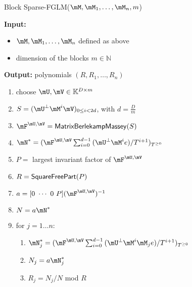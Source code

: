\documentclass[12pt]{article}
\begin{document}
\begin{algorithm}[H]
	\caption{Block Sparse-FGLM($\mM,\mM_1,\dots,\mM_n,m$)}
	{\bf Input:} \vspace{-0.5em}
	\begin{itemize}
		\item $\mM,\mM_1,\dots,\mM_n$ defined as above
		\item dimension of the blocks $m \in \mathbb{N}$
	\end{itemize}
	{\bf Output:} polynomials $(R,R_1,\dots,R_n)$
  \begin{enumerate}[{\bf 1.}]
		\item {\sf choose $\mU,\mV \in \mathbb{K}^{D \times m}$}
		\item {\sf $S= (\mU^{\perp}\mM^i\mV)_{0 \le i < 2d}$, with $d = \frac{D}{m}$}
		\item {\sf $\mF^{\mU,\mV} = {\sf MatrixBerlekampMassey}(S)$}
		\item {\sf $\mN^* = (\mF^{\mU,\mV}\sum_{i=0}^{d-1} {(\mU^{\perp}\mM^ie)}/{T^{i+1}})_{T^{\ge 0}}$} 
		\item {\sf $P=$ largest invariant factor of $\mF^{\mU,\mV}$}
		\item {\sf $R={\sf SquareFreePart}(P)$} 
		\item {\sf $a = [0 ~\cdots~ 0 ~ P] (\mF^{\mU,\mV})^{-1}$}
		\item {\sf $N=a\mN^*$}
		\item {\sf for $j = 1 \dots n$:}
    \begin{enumerate}[{\bf 9.1.}]
			\item {\sf	$\mN_j^* = (\mF^{\mU,\mV}
				\sum_{i= 0}^{d-1} {(\mU^{\perp}\mM^i \mM_j e)}/{T^{i+1}})_{T^{\ge0}}$}
			\item {\sf $N_j=a\mN_j^*$}
			\item {\sf $R_j=N_j/N$ mod $R$}
		\end{enumerate}
	\end{enumerate}
	\label{algo:block-sparse-fglm}
\end{algorithm}
\end{document}
